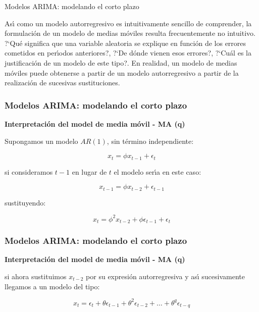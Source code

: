 \documentclass[spanish,xcolor=table]{beamer}
\begin{document}
\begin{section}{Modelos ARIMA: modelando el corto plazo}
\begin{frame}
 As\'{\i} como un modelo autorregresivo es intuitivamente sencillo de comprender, la formulaci\'on de un modelo de medias m\'oviles resulta frecuentemente no intuitivo. ?`Qu\'e significa que una variable aleatoria se explique en funci\'on de los errores cometidos en per\'{\i}odos anteriores?, ?`De d\'onde vienen esos errores?, ?`Cu\'al es la justificaci\'on de un modelo de este tipo?.
En realidad, un modelo de medias m\'oviles puede obtenerse a partir de un modelo autorregresivo a partir de la realizaci\'on de sucesivas sustituciones.

\end{frame}

\begin{frame}
\frametitle{Modelos ARIMA: modelando el corto plazo}

\textbf{Interpretaci\'on del model de media m\'ovil - MA (q)}

Supongamos un modelo $AR(1)$, sin t\'ermino independiente:

\begin{equation}
x_t =  \phi x_{t-1} + \epsilon_t
\end{equation}

si consideramos $t-1$ en lugar de $t$ el modelo ser\'{\i}a en este caso:

\begin{equation}
x_{t-1} =  \phi x_{t-2} + \epsilon_{t-1}
\end{equation}

sustituyendo:

\begin{equation}
x_t =  \phi^2 x_{t-2} + \phi \epsilon_{t-1} + \epsilon_t
\end{equation}

\end{frame}

\begin{frame}
\frametitle{Modelos ARIMA: modelando el corto plazo}

\textbf{Interpretaci\'on del model de media m\'ovil - MA (q)}

si ahora sustituimos $x_{t-2}$ por su expresi\'on autorregresiva y as\'{\i} sucesivamente llegamos a un modelo del tipo:

\begin{equation}
x_t = \epsilon_t + \theta \epsilon_{t-1} +  \theta^2 \epsilon_{t-2} + \dots{} +  \theta^q \epsilon_{t-q} 
\end{equation}


\end{frame}
\end{section}
\end{document}
